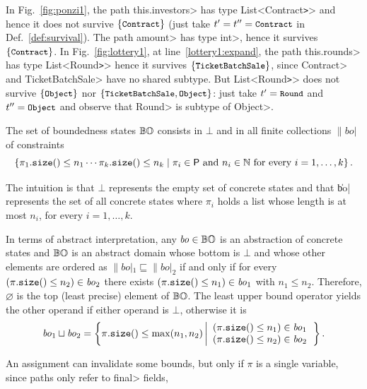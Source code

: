 \begin{example}
  In Fig.~\ref{fig:ponzi1}, the path \<this.investors> has type \<List<Contract\texttt{>}>
  and hence it does not survive $\{\<Contract>\}$ (just take $t'=t''=\<Contract>$
  in Def.~\ref{def:survival}).
  The path \<amount> has type \<int>, hence it survives $\{\<Contract>\}$.
  In Fig.~\ref{fig:lottery1}, at line~\ref{lottery1:expand}, the path
  \<this.rounds> has type \<List<Round\texttt{>}> hence it survives
  $\{\<TicketBatchSale>\}$, since \<Contract> and \<TicketBatchSale> have no
  shared subtype. But \<List<Round\texttt{>}> does not survive $\{\<Object>\}$ nor
  $\{\<TicketBatchSale>,\<Object>\}$: just take $t'=\<Round>$ and $t''=\<Object>$
  and observe that \<Round> is subtype of \<Object>.
\end{example}

\begin{definition}\label{def:bo}
  The set of boundedness states ${\mathbb{BO}}$ consists in
  $\bot$ and in all finite collections $\|bo|$ of constraints
  \[
  \left\{
  {\pi_1}\mathtt{.size()}\le n_1\cdots{\pi_k}\mathtt{.size()}\le n_k
  \mid\pi_i\in\mathsf{P}\text{ and }n_i\in\mathbb{N}\text{ for every $i=1,\ldots,k$}\right\}.
  \]
\end{definition}
%
The intuition is that $\bot$ represents the empty set of concrete states and
that \|bo| represents the set of all concrete states
where $\pi_i$ holds a list whose length is at most $n_i$, for every $i=1,\ldots,k$.
%
\begin{proposition}\label{prop:abstract_domain}
  In terms of abstract interpretation, any $\|bo|\in\bo$ is an abstraction
  of concrete states and ${\mathbb{BO}}$ is an abstract domain whose bottom is $\bot$
  and whose other elements are ordered as $\|bo|_1\sqsubseteq\|bo|_2$
  if and only if for every $(\size{\pi}\le n_2)\in\|bo|_2$ there exists
  $(\size{\pi}\le n_1)\in\|bo|_1$ with $n_1\le n_2$.
  Therefore, $\varnothing$ is the top (least precise) element of ${\mathbb{BO}}$.
  The least upper bound operator yields the other operand if either operand is
  $\bot$, otherwise it is
  \[
  \|bo|_1\sqcup\|bo|_2=\left\{\size{\pi}\le\max(n_1,n_2)\left|\begin{array}{l}
  (\size{\pi}\le n_1)\in\|bo|_1\\
  (\size{\pi}\le n_2)\in\|bo|_2
  \end{array}\right.\right\}.
  \]
\end{proposition}
%
An assignment can invalidate some bounds, but only if $\pi$
is a single variable, since paths only refer to \<final> fields,
